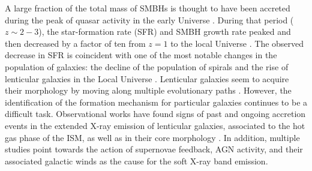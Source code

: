 \documentclass[modern]{CORE-AAS/aastex631}
\begin{document}
A large fraction of the total mass of SMBHs is thought to have been accreted during the peak of quasar activity in the early Universe \citep[$z=2-3$,][]{boyle+1998mnras293_49, delvecchio+2014mnras439_2736, madau+2014araa52_415}. During that period ($z\sim2-3$), the star-formation rate (SFR) and SMBH growth rate peaked and then decreased by a factor of ten from $z=1$ to the local Universe \citep{shankar+2009apj690_20}. The observed decrease in SFR is coincident with one of the most notable changes in the population of galaxies: the decline of the population of spirals and the rise of lenticular galaxies in the Local Universe \citep{dressler+1997apj490_577}.
Lenticular galaxies seem to acquire their morphology by moving along multiple evolutionary paths 
\citep[accretion, mergers, secular evolution, thermal stripping of the gas content][]{laurikainen+2010mnras405_1089, larson+1980apj237_692, moore+1996nat379_613, barway+2009mnras394_1991, borlaff+2014aap570_103, elichemoral+2018aap617_113, frasermckelvie+2018mnras481_5580}. However, the identification of the formation mechanism for particular galaxies continues to be a difficult task. Observational works have found signs of past \citep{machacek+2010apj711_1316} and ongoing \citep{wang+2019apj870_132} accretion events in the extended X-ray emission of lenticular galaxies, associated to the hot gas phase of the ISM, as well as in their core morphology \citep{juravnova+2019mnras484_2886}. In addition, multiple studies point towards the action of supernovae feedback, AGN activity, and their associated galactic winds as the cause for the soft X-ray band emission.
\end{document}
